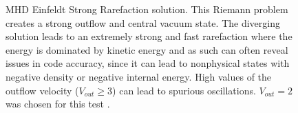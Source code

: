 \begin{figure}[ht!]
    \caption{MHD Einfeldt Strong Rarefaction solution. This Riemann problem creates a strong outflow and central vacuum state. The diverging solution leads to an extremely strong and fast rarefaction where the energy is dominated by kinetic energy and as such can often reveal issues in code accuracy, since it can lead to nonphysical states with negative density or negative internal energy. High values of the outflow velocity ($V_{out}\ge3$) can lead to spurious oscillations. $V_{out} = 2$ was chosen for this test \citep{charm_2011}.
    }
    \label{fig:einfeldt}
\end{figure}